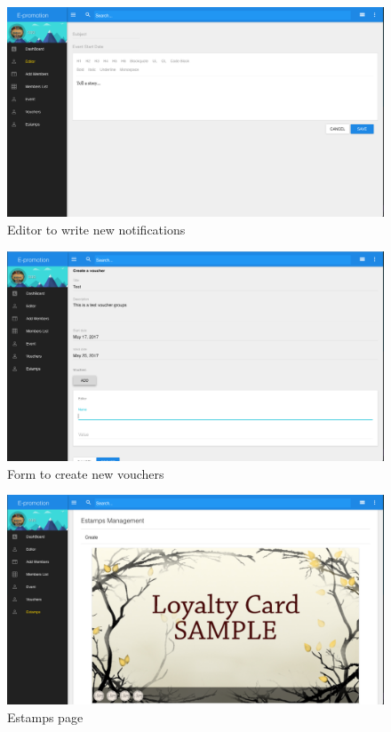\documentclass[12pt]{scrartcl}
\begin{document}
\begin{figure}[htbp]
\caption{\label{fig:org90ab7ca}
Editor to write new notifications}
\centering
\includegraphics[width=.9\linewidth]{./img/editor.png}
\end{figure}
\begin{figure}[htbp]
\caption{\label{fig:orgbb5aa01}
Form to create new vouchers}
\centering
\includegraphics[width=.9\linewidth]{./img/voucher.png}
\end{figure}
\begin{figure}[htbp]
\caption{\label{fig:org4f8b0d1}
Estamps page}
\centering
\includegraphics[width=.9\linewidth]{./img/estamp.png}
\end{figure}
\end{document}
